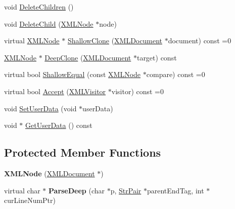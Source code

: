 \begin{DoxyCompactItemize}
void \hyperlink{classCPlantBox_1_1tinyxml2_1_1XMLNode_a651911b098e01fe85a8a4874c7708eb3}{Delete\+Children} ()
\item 
void \hyperlink{classCPlantBox_1_1tinyxml2_1_1XMLNode_afbab01f2230e6b9a9327a92e4de92fd0}{Delete\+Child} (\hyperlink{classCPlantBox_1_1tinyxml2_1_1XMLNode}{X\+M\+L\+Node} $\ast$node)
\item 
virtual \hyperlink{classCPlantBox_1_1tinyxml2_1_1XMLNode}{X\+M\+L\+Node} $\ast$ \hyperlink{classCPlantBox_1_1tinyxml2_1_1XMLNode_a8439e4e87206b26bc03427ffac3e882a}{Shallow\+Clone} (\hyperlink{classCPlantBox_1_1tinyxml2_1_1XMLDocument}{X\+M\+L\+Document} $\ast$document) const =0
\item 
\hyperlink{classCPlantBox_1_1tinyxml2_1_1XMLNode}{X\+M\+L\+Node} $\ast$ \hyperlink{classCPlantBox_1_1tinyxml2_1_1XMLNode_a444bb1393c147907bf4111439b377c15}{Deep\+Clone} (\hyperlink{classCPlantBox_1_1tinyxml2_1_1XMLDocument}{X\+M\+L\+Document} $\ast$target) const
\item 
virtual bool \hyperlink{classCPlantBox_1_1tinyxml2_1_1XMLNode_a1019a06dab15152f06f3a879bf9a85c9}{Shallow\+Equal} (const \hyperlink{classCPlantBox_1_1tinyxml2_1_1XMLNode}{X\+M\+L\+Node} $\ast$compare) const =0
\item 
virtual bool \hyperlink{classCPlantBox_1_1tinyxml2_1_1XMLNode_a2cdc6f044bd1f971e211328e42a4f9d5}{Accept} (\hyperlink{classCPlantBox_1_1tinyxml2_1_1XMLVisitor}{X\+M\+L\+Visitor} $\ast$visitor) const =0
\item 
void \hyperlink{classCPlantBox_1_1tinyxml2_1_1XMLNode_a67f5ec20f5bf0623b39b5f8489f90590}{Set\+User\+Data} (void $\ast$user\+Data)
\item 
void $\ast$ \hyperlink{classCPlantBox_1_1tinyxml2_1_1XMLNode_a8fae4c40dbef5d89bda8e884498c2adf}{Get\+User\+Data} () const
\end{DoxyCompactItemize}
\subsection*{Protected Member Functions}
\begin{DoxyCompactItemize}
\item 
\mbox{\label{classCPlantBox_1_1tinyxml2_1_1XMLNode_af34008a2174732605d7dcd44004368f8}} 
{\bfseries X\+M\+L\+Node} (\hyperlink{classCPlantBox_1_1tinyxml2_1_1XMLDocument}{X\+M\+L\+Document} $\ast$)
\item 
\mbox{\label{classCPlantBox_1_1tinyxml2_1_1XMLNode_a8f6a04b0bf64f6d4e4547b40cf393467}} 
virtual char $\ast$ {\bfseries Parse\+Deep} (char $\ast$p, \hyperlink{classCPlantBox_1_1tinyxml2_1_1StrPair}{Str\+Pair} $\ast$parent\+End\+Tag, int $\ast$cur\+Line\+Num\+Ptr)
\end{DoxyCompactItemize}
